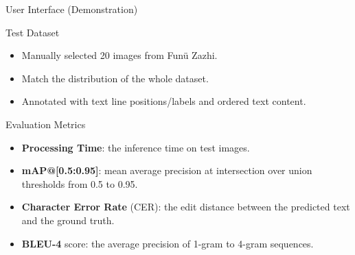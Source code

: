 \documentclass{beamer}
\begin{document}
\begin{frame}
    \begin{center}
        \Large{User Interface (Demonstration)}
    \end{center}
\end{frame}

\begin{frame}
    \begin{center}
        \Large{Test Dataset}
    \end{center}
    \begin{itemize}
        \item Manually selected 20 images from Funü Zazhi.
        \item Match the distribution of the whole dataset.
        \item Annotated with text line positions/labels and ordered text content.
    \end{itemize}
\end{frame}

\begin{frame}
    \begin{center}
        \Large{Evaluation Metrics}
    \end{center}
    \begin{itemize}
        \item \textbf{Processing Time}: the inference time on test images.
        \item \textbf{mAP@[0.5:0.95]}: mean average precision at intersection over union thresholds from 0.5 to 0.95.
        \item \textbf{Character Error Rate} (CER): the edit distance between the predicted text and the ground truth.
        \item \textbf{BLEU-4} score: the average precision of 1-gram to 4-gram sequences.
    \end{itemize}
\end{frame}
\end{document}
